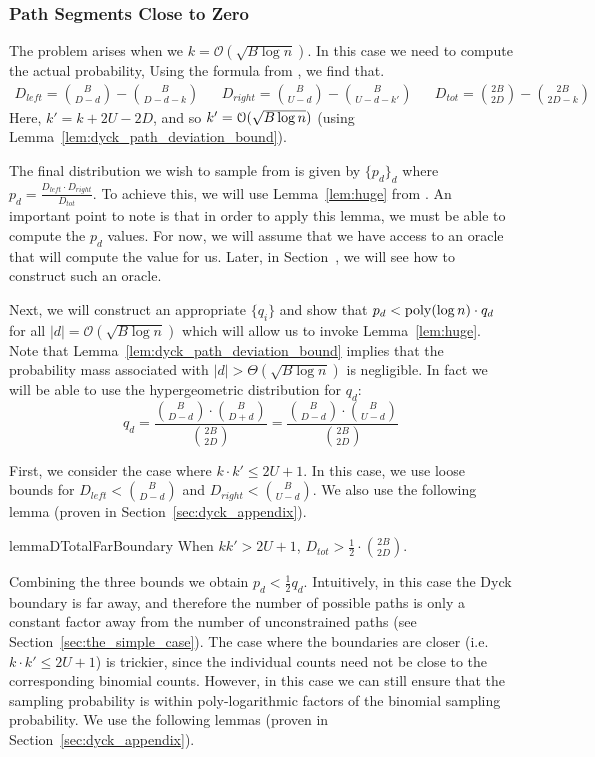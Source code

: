 \subsubsection{Path Segments Close to Zero}
The problem arises when we $k = \mathcal{O}(\sqrt{B\log n})$. In this case we need to compute the actual probability,
Using the formula from \cite{trap}, we find that.
{\scriptsize
    \begin{align}
        D_{left} = {{B}\choose{D-d}}-{{B}\choose{D-d-k}}
        &&D_{right} = {{B}\choose{U-d}}-{{B}\choose{U-d-k'}}
        &&D_{tot} = {{2B}\choose{2D}}-{{2B}\choose{2D-k}}
    \end{align}
}
Here, $k' = k+2U-2D$, and so $k' = \Bo(\sqrt{B\log n})$ (using Lemma~\ref{lem:dyck_path_deviation_bound}).

The final distribution we wish to sample from is given by $\{p_d\}_d$ where $p_d = \frac{D_{left}\cdot D_{right}}{D_{tot}}$.
To achieve this, we will use Lemma~\ref{lem:huge} from \cite{huge}.
An important point to note is that in order to apply this lemma, we must be able to compute the $p_d$ values.
For now, we will assume that we have access to an oracle that will compute the value for us.
Later, in Section~, we will see how to construct such an oracle.

Next, we will construct an appropriate $\{q_i\}$ and show that $p_d < \mathrm{poly}(\log n)\cdot q_d$ for all $|d|=\mathcal O(\sqrt{B\log n})$
which will allow us to invoke Lemma~\ref{lem:huge}.
Note that Lemma~\ref{lem:dyck_path_deviation_bound} implies that the probability mass associated with $|d|>\Theta(\sqrt{B\log n})$ is negligible.
In fact we will be able to use the hypergeometric distribution for $q_d$:
$$
q_d = \frac{{B\choose D-d}\cdot{B\choose D+d}}{{2B\choose 2D}} = \frac{{B\choose D-d}\cdot{B\choose U-d}}{{2B\choose 2D}}
$$

First, we consider the case where $k\cdot k'\le 2U+1$.
In this case, we use loose bounds for $D_{left} < \binom{B}{D-d}$ and $D_{right} < \binom{B}{U-d}$.
We also use the following lemma (proven in Section~\ref{sec:dyck_appendix}).
\begin{restatable}{lemma}{DTotalFarBoundary}
\label{lem:DTotalFarBoundary}
When $kk' > 2U + 1$, $D_{tot} > \frac 12\cdot \binom{2B}{2D}$.
\end{restatable}

Combining the three bounds we obtain $p_d < \frac 12 q_d$.
Intuitively, in this case the Dyck boundary is far away, and therefore the number of possible paths
is only a constant factor away from the number of unconstrained paths (see Section~\ref{sec:the_simple_case}).
The case where the boundaries are closer (i.e. $k\cdot k' \le 2U+1$) is trickier,
since the individual counts need not be close to the corresponding binomial counts.
However, in this case we can still ensure that the sampling probability is within
poly-logarithmic factors of the binomial sampling probability.
We use the following lemmas (proven in Section~\ref{sec:dyck_appendix}).

